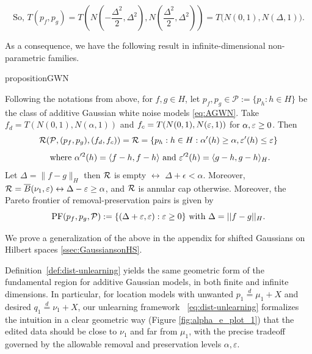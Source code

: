 \begin{equation}
   \text{So, } T(p_f,p_{g})
    = 
    T\left(N\left(-\frac{\Delta^2}{2}, \Delta^2\right), N\left(\frac{\Delta^2}{2}, \Delta^2\right)\right)
=T\bigl(N(0,1),N(\Delta,1)\bigr).
\end{equation}

As a consequence, we have the following result in infinite-dimensional non-parametric families.

\begin{restatable}{proposition}{GWN}
\label{thm:GWN}

Following the notations from above, for $f,g\in H$, let $p_f, p_g \in   \mathcal{P}:= \{p_h: h \in H\}$ be the class of additive Gaussian white noise models \eqref{eq:AGWN}. Take $f_d= T(N(0,1), N(\alpha, 1))$ and $f_c= T(N(0,1), N(\varepsilon,1))$ for $\alpha, \varepsilon \geq 0$. Then  
\vspace{-2mm}
\begin{equation} \label{eq:GWNFR}
\mathcal{R}(\mathcal{P}, (p_f,p_g), (f_d,f_c)) =
\mathcal{R}= \{p_h: h\in H: \alpha'(h) \geq \alpha, \varepsilon'(h) \leq \varepsilon\} 
\end{equation}
\begin{equation} \label{eq:GWNFRparameters0}
\text{ where } \alpha'^2(h)= \langle f-h, f-h \rangle \text{ and }\varepsilon'^2(h)= \langle g-h, g-h \rangle_{H}. 
\end{equation}
Let $\Delta= \|f- g\|_{H}$  then $\mathcal{R}$ is empty $\leftrightarrow$ $ \Delta + \epsilon <\alpha $. Moreover, $\mathcal{R}= \overline{B}(\nu_1, \varepsilon) \leftrightarrow \Delta - \varepsilon \geq \alpha $, and $\mathcal{R}$ is annular cap otherwise. Moreover, the Pareto frontier of removal-preservation pairs is given by
\begin{equation} \label{eq:ParetoGWN}
    \text{PF}(p_f, p_g, \mathcal{P}) := \{(\Delta +\varepsilon, \varepsilon): \varepsilon \geq 0\} \text{ with } \Delta = ||f-g||_H.
\end{equation}
\end{restatable}
\vspace{-2 mm}
We prove a generalization of the above in the appendix for shifted Gaussians on Hilbert spaces \ref{ssec:GaussiansonHS}.
\vspace{-1mm}
\begin{remark}
    Definition~\ref{def:dist-unlearning} yields the same geometric form of the fundamental region for additive Gaussian models, in both finite and infinite dimensions. In particular, for location models with unwanted $p_1\overset{d}{=} \mu_1+X$ and desired $q_1\overset{d}{=}\nu_1+X$, our unlearning framework ~\eqref{eq:dist-unlearning} formalizes the intuition in a clear geometric way (Figure \ref{fig:alpha_e_plot_1}) that the edited data should be close to $\nu_1$ and far from $\mu_1$, with the precise tradeoff governed by the allowable removal and preservation levels $\alpha,\varepsilon$.
\end{remark}
\vspace{-5mm}
